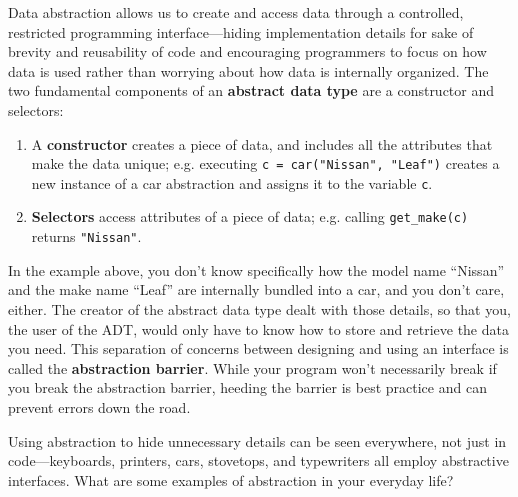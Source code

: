 Data abstraction allows us to create and access data through a controlled, restricted programming interface---hiding implementation details for sake of brevity and reusability of code and encouraging programmers to focus on how data is used rather than worrying about how data is internally organized. The two fundamental components of an \textbf{abstract data type} are a constructor and selectors:
\begin{enumerate}
	\item A \textbf{constructor} creates a piece of data, and includes all the attributes that make the data unique; e.g. executing \texttt{c = car("Nissan", "Leaf")} creates a new instance of a car abstraction and assigns it to the variable \lstinline{c}.
	\item \textbf{Selectors} access attributes of a piece of data; e.g. calling \lstinline{get_make(c)} returns \lstinline{"Nissan"}.
\end{enumerate}

In the example above, you don't know specifically how the model name ``Nissan'' and the make name ``Leaf'' are internally bundled into a car, and you don't care, either. The creator of the abstract data type dealt with those details, so that you, the user of the ADT, would only have to know how to store and retrieve the data you need. This separation of concerns between designing and using an interface is called the \textbf{abstraction barrier}. While your program won't necessarily break if you break the abstraction barrier, heeding the barrier is best practice and can prevent errors down the road. 

Using abstraction to hide unnecessary details can be seen everywhere, not just in code---keyboards, printers, cars, stovetops, and typewriters all employ abstractive interfaces. What are some examples of abstraction in your everyday life? 